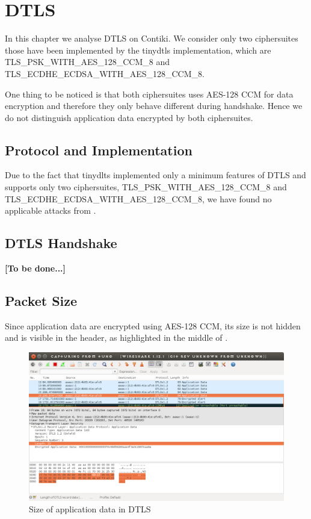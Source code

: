 \chapter{DTLS} \label{Chp: DTLS}

In this chapter we analyse DTLS on Contiki. We consider only two ciphersuites those have been implemented by the tinydtls implementation, which are TLS\_PSK\_WITH\_AES\_128\_CCM\_8 and TLS\_ECDHE\_ECDSA\_WITH\_AES\_128\_CCM\_8. 

One thing to be noticed is that both ciphersuites uses AES-128 CCM for data encryption and therefore they only behave different during handshake. Hence we do not distinguish application data encrypted by both ciphersuites.

\section{Protocol and Implementation}

Due to the fact that tinydlts implemented only a minimum features of DTLS and supports only two ciphersuites, TLS\_PSK\_WITH\_AES\_128\_CCM\_8 and TLS\_ECDHE\_ECDSA\_WITH\_AES\_128\_CCM\_8, we have found no applicable attacks from \cite{rfc7457}.

\section{DTLS Handshake}

\textbf{[To be done...]}

\section{Packet Size}

Since application data are encrypted using AES-128 CCM, its size is not hidden and is visible in the header, as highlighted in the middle of .

\begin{figure}[ht!]
	\center
	\includegraphics[width=.7\textwidth]{fig/dtlslength.png}
	\caption{Size of application data in DTLS}
	\label{Fig: Size of application data in DTLS}
\end{figure}

